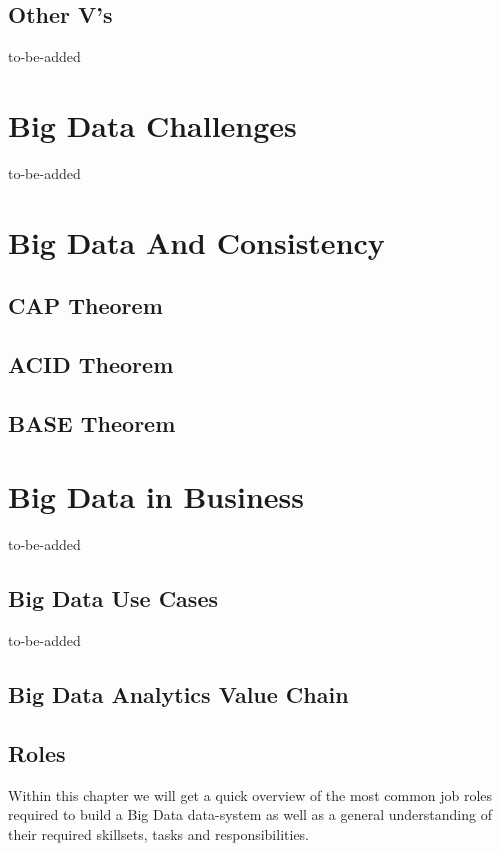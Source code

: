 \subsection{Other V's}
\label{bd_vs_other_vs}
to-be-added

\section{Big Data Challenges}
\label{bd_def}
to-be-added

\section{Big Data And Consistency}
\label{bd_consistency}

\subsection{CAP Theorem}
\label{bd_consistency_cap}

\subsection{ACID Theorem}
\label{bd_consistency_acid}

\subsection{BASE Theorem}
\label{bd_consistency_base}

\section{Big Data in Business}
\label{bd_bdib}
to-be-added

\subsection{Big Data Use Cases}
\label{bd_bdib_ucases}
to-be-added

\subsection{Big Data Analytics Value Chain}
\label{bd_bdib_vchain}

\subsection{Roles}
\label{bd_bdib_roles}
Within this chapter we will get a quick overview of the most common job roles required to build a Big Data data-system as well as a general understanding of their required skillsets, tasks and responsibilities.

